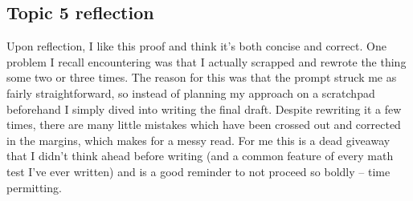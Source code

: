 \documentclass[11pt, letterpaper]{article}
\begin{document}
\subsection*{Topic 5 reflection}
Upon reflection, I like this proof and think it's both concise and correct. One problem I recall encountering
was that I actually scrapped and rewrote the thing some two or three times. The reason for this
was that the prompt struck me as fairly straightforward, so instead of planning my approach on a scratchpad
beforehand I simply dived into writing the final draft. Despite rewriting it a few times, there are many
little mistakes which have been crossed out and corrected in the margins, which makes for a messy read.
For me this is a dead giveaway that I didn't think ahead before writing (and a common feature of every
math test I've ever written) and is a good reminder to not proceed so boldly -- time permitting.
\end{document}
